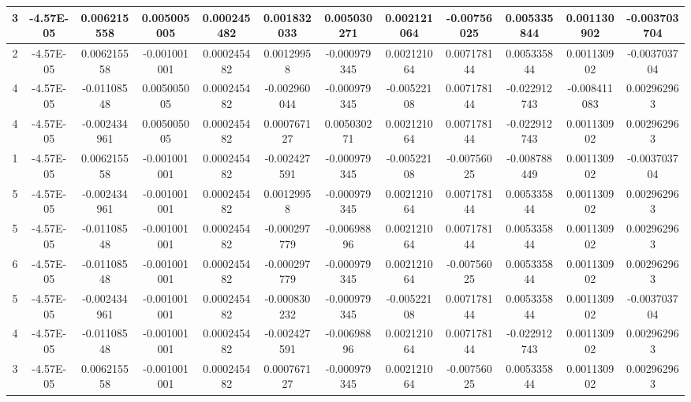 \documentclass[UTF8]{ctexart}
\begin{document}
\begin{itemize}
\begin{itemize}
\begin{table}[!ht]
{{\begin{tabular}{|c|c|c|c|c|c|c|c|c|c|c|c|}
						            3        & -4.57E-05   & 0.006215558  & 0.005005005  & 0.000245482   & 0.001832033  & 0.005030271  & 0.002121064  & -0.00756025 & 0.005335844  & 0.001130902  & -0.003703704 \\ \hline
						            2        & -4.57E-05   & 0.006215558  & -0.001001001 & 0.000245482   & 0.00129958   & -0.000979345 & 0.002121064  & 0.007178144 & 0.005335844  & 0.001130902  & -0.003703704 \\ \hline
						            4        & -4.57E-05   & -0.01108548  & 0.005005005  & 0.000245482   & -0.002960044 & -0.000979345 & -0.00522108  & 0.007178144 & -0.022912743 & -0.008411083 & 0.002962963  \\ \hline
						            4        & -4.57E-05   & -0.002434961 & 0.005005005  & 0.000245482   & 0.000767127  & 0.005030271  & 0.002121064  & 0.007178144 & -0.022912743 & 0.001130902  & 0.002962963  \\ \hline
						            1        & -4.57E-05   & 0.006215558  & -0.001001001 & 0.000245482   & -0.002427591 & -0.000979345 & -0.00522108  & -0.00756025 & -0.008788449 & 0.001130902  & -0.003703704 \\ \hline
						            5        & -4.57E-05   & -0.002434961 & -0.001001001 & 0.000245482   & 0.00129958   & -0.000979345 & 0.002121064  & 0.007178144 & 0.005335844  & 0.001130902  & 0.002962963  \\ \hline
						            5        & -4.57E-05   & -0.01108548  & -0.001001001 & 0.000245482   & -0.000297779 & -0.00698896  & 0.002121064  & 0.007178144 & 0.005335844  & 0.001130902  & 0.002962963  \\ \hline
						            6        & -4.57E-05   & -0.01108548  & -0.001001001 & 0.000245482   & -0.000297779 & -0.000979345 & 0.002121064  & -0.00756025 & 0.005335844  & 0.001130902  & 0.002962963  \\ \hline
						            5        & -4.57E-05   & -0.002434961 & -0.001001001 & 0.000245482   & -0.000830232 & -0.000979345 & -0.00522108  & 0.007178144 & 0.005335844  & 0.001130902  & -0.003703704 \\ \hline
						            4        & -4.57E-05   & -0.01108548  & -0.001001001 & 0.000245482   & -0.002427591 & -0.00698896  & 0.002121064  & 0.007178144 & -0.022912743 & 0.001130902  & 0.002962963  \\ \hline
						            3        & -4.57E-05   & 0.006215558  & -0.001001001 & 0.000245482   & 0.000767127  & -0.000979345 & 0.002121064  & -0.00756025 & 0.005335844  & 0.001130902  & 0.002962963  \\ \hline

\end{tabular}}}
\end{table}
\end{itemize}
\end{itemize}
\end{document}
